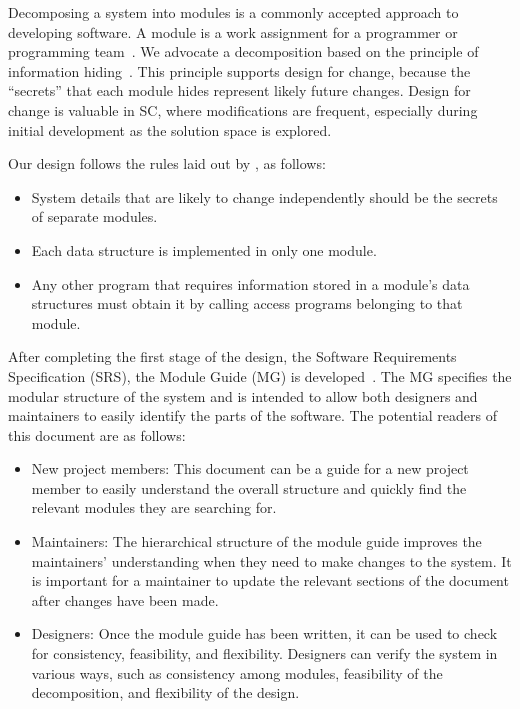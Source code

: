 \documentclass[12pt, titlepage]{article}
\begin{document}
Decomposing a system into modules is a commonly accepted approach to developing
software.  A module is a work assignment for a programmer or programming
team~\citep{ParnasEtAl1984}.  We advocate a decomposition
based on the principle of information hiding~\citep{Parnas1972a}.  This
principle supports design for change, because the ``secrets'' that each module
hides represent likely future changes.  Design for change is valuable in SC,
where modifications are frequent, especially during initial development as the
solution space is explored.  

Our design follows the rules laid out by \citet{ParnasEtAl1984}, as follows:
\begin{itemize}
\item System details that are likely to change independently should be the
  secrets of separate modules.
\item Each data structure is implemented in only one module.
\item Any other program that requires information stored in a module's data
  structures must obtain it by calling access programs belonging to that module.
\end{itemize}

After completing the first stage of the design, the Software Requirements
Specification (SRS), the Module Guide (MG) is developed~\citep{ParnasEtAl1984}. The MG
specifies the modular structure of the system and is intended to allow both
designers and maintainers to easily identify the parts of the software.  The
potential readers of this document are as follows:

\begin{itemize}
\item New project members: This document can be a guide for a new project member
  to easily understand the overall structure and quickly find the
  relevant modules they are searching for.
\item Maintainers: The hierarchical structure of the module guide improves the
  maintainers' understanding when they need to make changes to the system. It is
  important for a maintainer to update the relevant sections of the document
  after changes have been made.
\item Designers: Once the module guide has been written, it can be used to
  check for consistency, feasibility, and flexibility. Designers can verify the
  system in various ways, such as consistency among modules, feasibility of the
  decomposition, and flexibility of the design.
\end{itemize}
\end{document}

